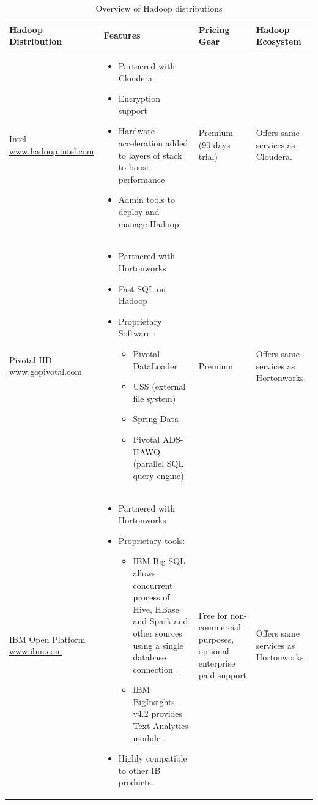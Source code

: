 \begin{table}[H]
\hspace{-3.3cm}
\begin{tabular}{|p{4.4cm}|p{6.2cm}|p{4cm}|p{4cm}|}
	\hline
	\textbf{Hadoop \newline Distribution} & \textbf{Features} & \textbf{ Pricing Gear}  & \textbf{ Hadoop \newline Ecosystem}\\ \hline
Intel
\href{https://http://hadoop.intel.com/}{www.hadoop.intel.com}
&\begin{itemize}[noitemsep,leftmargin=*] 
\item Partnered with Cloudera \citep{MervAdrian2017}
\item Encryption support
\item Hardware acceleration added to layers of stack to boost performance
\item Admin tools to deploy and manage Hadoop
\end{itemize}&
Premium (90 days trial) & Offers same
services as
Cloudera. \\ \hline
Pivotal HD
 \href{https://gopivotal.com//} {www.gopivotal.com} &\begin{itemize}[noitemsep,leftmargin=*] 
\item Partnered with Hortonworks \citep{MervAdrian2017}
\item Fast SQL on Hadoop
\item Proprietary Software \citep{Pivotal2018}:
\begin{itemize}
\item Pivotal DataLoader
\item USS (external file system)
\item Spring Data
\item Pivotal ADS-HAWQ (parallel SQL query engine)
\end{itemize}
\end{itemize}& Premium &Offers same services as Hortonworks.\\ \hline
IBM Open Platform
\href{https://www.ibm.com/de-de/?ar=1}{www.ibm.com}&\begin{itemize}[noitemsep,leftmargin=*] 
\item Partnered with Hortonworks \citep{MervAdrian2017}
\item Proprietary tools:
\begin{itemize}
\item IBM Big SQL allows concurrent process of Hive, HBase and Spark and other sources using a single database connection \citep{MervAdrian2017}.
\item IBM BigInsights v4.2 provides Text-Analytics module \citep{I.K.Center2018}.
\end{itemize}
\item Highly compatible to other IB products.
\end{itemize}
&Free for non-commercial purposes, optional enterprise paid support \citep{IBMAnalytics2018}
& Offers same services as Hortonworks.\\ \hline
\end{tabular}
\caption{Overview of Hadoop distributions}
\label{tab:distributions}
\end{table}

